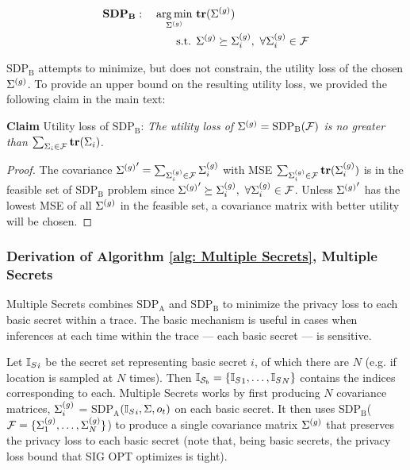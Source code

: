 \begin{align*}
	\textbf{SDP}_\textbf{B}: \quad 
	\operatorname*{arg\,min}_{\Sigma^{(g)} } \  &\mathbf{tr}(\Sigma^{(g)}) \\
	\text{s.t. }& \Sigma^{(g)} \succeq \Sigma^{(g)}_i , \ \forall \Sigma^{(g)}_i \in \mathcal{F}
\end{align*}

$\text{SDP}_\text{B}$ attempts to minimize, but does not constrain, the utility loss of the chosen $\Sigma^{(g)}$. To provide an upper bound on the resulting utility loss, we provided the following claim in the main text: 

\textbf{Claim} Utility loss of $\text{SDP}_\text{B}$: 
\emph{
	The utility loss of $\Sigma^{(g)} = \text{SDP}_\text{B}(\mathcal{F})$ is no greater than $\sum_{\Sigma_i \in \mathcal{F}} \mathbf{tr}(\Sigma_i)$. 
}
\begin{proof}
	The covariance ${\Sigma^{(g)}}' = \sum_{\Sigma^{(g)}_i \in \mathcal{F}} \Sigma^{(g)}_i$ with MSE $\sum_{\Sigma^{(g)}_i \in \mathcal{F}} \mathbf{tr}(\Sigma^{(g)}_i)$ is in the feasible set of $\text{SDP}_\text{B}$ problem since ${\Sigmag}' \succeq \Sigmag_i, \ \forall \Sigmag_i \in \calF$. Unless ${\Sigma^{(g)}}'$ has the lowest MSE of all $\Sigma^{(g)}$ in the feasible set, a covariance matrix with better utility will be chosen. 
\end{proof}

\subsubsection{Derivation of Algorithm \ref{alg: Multiple Secrets}, Multiple Secrets}

Multiple Secrets combines $\text{SDP}_\text{A}$ and $\text{SDP}_\text{B}$ to minimize the privacy loss to each basic secret within a trace. The basic mechanism is useful in cases when inferences at each time within the trace --- each basic secret --- is sensitive. 

Let ${{\mathbb{I}_S}}_i$ be the secret set representing basic secret $i$, of which there are $N$ (e.g. if location is sampled at $N$ times). Then $\mathbb{I}_{\mathcal{S}_b} = \{{{\mathbb{I}_S}}_1, \dots, {{\mathbb{I}_S}}_N\}$ contains the indices corresponding to each. Multiple Secrets works by first producing $N$ covariance matrices, $\Sigma^{(g)}_i$ = $\text{SDP}_\text{A}$$({{\mathbb{I}_S}}_i, \Sigma, o_t)$ on each basic secret. It then uses $\text{SDP}_\text{B}$($\mathcal{F} = \{\Sigma^{(g)}_1, \dots, \Sigma^{(g)}_N\}$) to produce a single covariance matrix $\Sigma^{(g)}$ that preserves the privacy loss to each basic secret (note that, being basic secrets, the privacy loss bound that SIG OPT optimizes is tight). 

